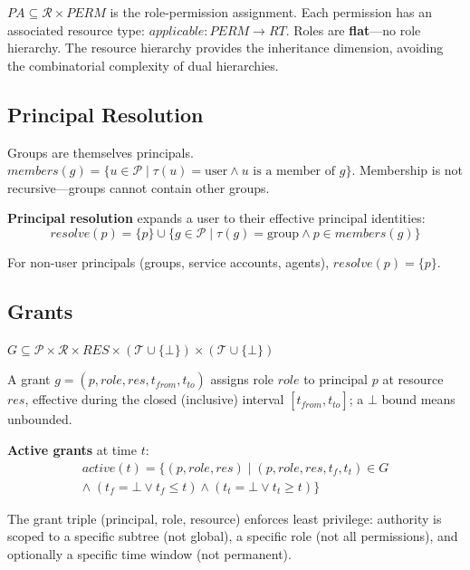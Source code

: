 \documentclass[conference]{IEEEtran}
\begin{document}
$PA \subseteq \mathcal{R} \times \mathit{PERM}$ is the role-permission assignment. Each permission has an associated resource type: $\mathit{applicable}: \mathit{PERM} \to \mathit{RT}$. Roles are \textbf{flat}---no role hierarchy. The resource hierarchy provides the inheritance dimension, avoiding the combinatorial complexity of dual hierarchies.

\subsection{Principal Resolution}

Groups are themselves principals. $\mathit{members}(g) = \{u \in \mathcal{P} \mid \tau(u) = \text{user} \wedge u \text{ is a member of } g\}$. Membership is not recursive---groups cannot contain other groups.

\textbf{Principal resolution} expands a user to their effective principal identities:
\[
\mathit{resolve}(p) = \{p\} \cup \{g \in \mathcal{P} \mid \tau(g) = \text{group} \wedge p \in \mathit{members}(g)\}
\]

For non-user principals (groups, service accounts, agents), $\mathit{resolve}(p) = \{p\}$.

\subsection{Grants}

$G \subseteq \mathcal{P} \times \mathcal{R} \times \mathit{RES} \times (\mathcal{T} \cup \{\bot\}) \times (\mathcal{T} \cup \{\bot\})$

A grant $g = (p, \mathit{role}, \mathit{res}, t_{\mathit{from}}, t_{\mathit{to}})$ assigns role $\mathit{role}$ to principal $p$ at resource $\mathit{res}$, effective during the closed (inclusive) interval $[t_{\mathit{from}}, t_{\mathit{to}}]$; a $\bot$ bound means unbounded.

\textbf{Active grants} at time $t$:
\begin{multline*}
\mathit{active}(t) = \{(p, \mathit{role}, \mathit{res}) \mid (p, \mathit{role}, \mathit{res}, t_f, t_t) \in G \\
\wedge\; (t_f = \bot \vee t_f \leq t) \wedge (t_t = \bot \vee t_t \geq t)\}
\end{multline*}

The grant triple (principal, role, resource) enforces least privilege: authority is scoped to a specific subtree (not global), a specific role (not all permissions), and optionally a specific time window (not permanent).
\end{document}
